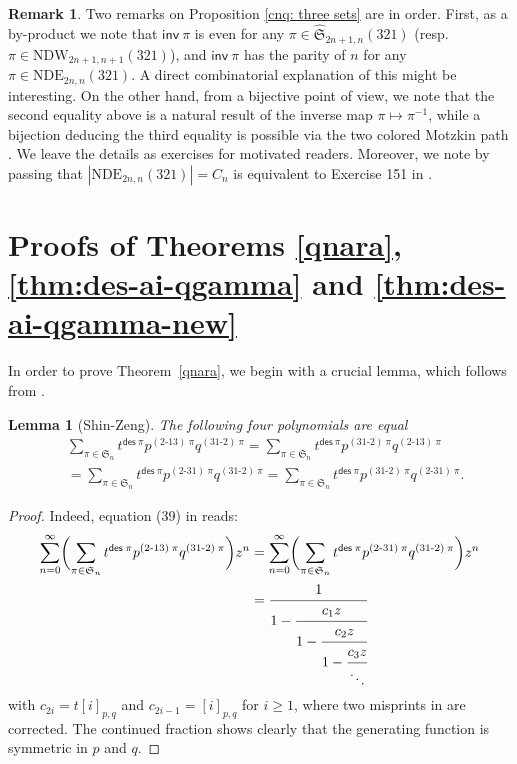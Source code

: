\documentclass[12pt,reqno]{amsart}
\numberwithin{equation}{section}
\theoremstyle{plain}
\newtheorem{lemma}[theorem]{Lemma}
\theoremstyle{definition}
\newtheorem{remark}[theorem]{Remark}
\def\S{\mathfrak{S}}
\def\des{\mathsf{des}}
\def\inv{\mathsf{inv}}
\def\icr{\mathsf{icr}}
\def\cab{31\text{-}2}
\def\bca{2\text{-}31}
\def\bac{2\text{-}13}
\begin{document}
\begin{remark}
Two remarks on Proposition \ref{cnq: three sets} are in order. First, as a by-product we note that $\inv\:\pi$ is even for any $\pi\in\widehat{\S}_{2n+1,n}(321)$ (resp. $\pi\in\textrm{NDW}_{2n+1,n+1}(321)$), and $\inv\:\pi$ has the parity of $n$ for any $\pi\in\textrm{NDE}_{2n,n}(321)$. A direct combinatorial explanation of this might be interesting. On the other hand, from a bijective point of view, we note that the second equality above is a natural result of the inverse map $\pi \mapsto \pi^{-1}$, while a bijection deducing the third equality is possible via the two colored Motzkin path \cite{Lin17,LF17}. We leave the details as exercises for motivated readers. Moreover, we note by passing that $|\text{NDE}_{2n,n}(321)|=C_n$ is equivalent to Exercise 151 in \cite{Sta2}.
\end{remark}



\section{Proofs of Theorems \ref{qnara}, \ref{thm:des-ai-qgamma} and \ref{thm:des-ai-qgamma-new}}
\label{sec3: gamma-q-nara}

In order to prove Theorem~\ref{qnara}, we begin with a crucial lemma, which follows from \cite[Eq. (39)]{SZ12}.
\begin{lemma}[Shin-Zeng]\label{SZL1} The following four polynomials are equal
\begin{align*}
&\sum_{\pi\in\S_n}t^{\des\:\pi}p^{(\bac)\:\pi}q^{(\cab)\:\pi}=\sum_{\pi\in\S_n}t^{\des\:\pi}p^{(\cab)\:\pi}q^{(\bac)\:\pi}\\
&=\sum_{\pi\in\S_n}t^{\des\:\pi}p^{(\bca)\:\pi}q^{(\cab)\:\pi}=
\sum_{\pi\in\S_n}t^{\des\:\pi}p^{(\cab)\:\pi}q^{(\bca)\:\pi}.
\end{align*}
\end{lemma}
\begin{proof} Indeed, equation (39) in \cite{SZ12} reads:
\begin{align*}
\sum_{n=0}^{\infty} \biggl(\sum_{\pi\in\S_n}t^{\des\:\pi}p^{(\bac)\:\pi}q^{(\cab)\:\pi}\biggr)z^n&=
\sum_{n=0}^{\infty}\biggl(\sum_{\pi\in\S_n}t^{\des\:\pi}p^{(\bca)\:\pi}q^{(\cab)\:\pi}\biggr)z^n\\
&=\cfrac{1}{1-\cfrac{c_1z}{1-\cfrac{c_2z}{1-\cfrac{c_3z}{\ddots}}}}
\end{align*}
with $c_{2i}=t[i]_{p,q}$ and $c_{2i-1}=[i]_{p,q}$ for $i\geq 1$, where two misprints in \cite{SZ12} are corrected.
The continued fraction shows clearly that the generating function is symmetric in $p$ and $q$.
\end{proof}
\end{document}
